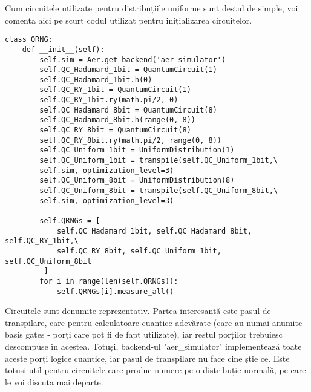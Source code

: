 Cum circuitele utilizate pentru distribuțiile uniforme sunt destul de simple, voi comenta aici pe scurt codul utilizat pentru inițializarea circuitelor.
\pagebreak
\begin{code}
\begin{verbatim}
class QRNG:
    def __init__(self):
        self.sim = Aer.get_backend('aer_simulator')
        self.QC_Hadamard_1bit = QuantumCircuit(1)
        self.QC_Hadamard_1bit.h(0)
        self.QC_RY_1bit = QuantumCircuit(1)
        self.QC_RY_1bit.ry(math.pi/2, 0)
        self.QC_Hadamard_8bit = QuantumCircuit(8)
        self.QC_Hadamard_8bit.h(range(0, 8))
        self.QC_RY_8bit = QuantumCircuit(8)
        self.QC_RY_8bit.ry(math.pi/2, range(0, 8))
        self.QC_Uniform_1bit = UniformDistribution(1)
        self.QC_Uniform_1bit = transpile(self.QC_Uniform_1bit,\
        self.sim, optimization_level=3)
        self.QC_Uniform_8bit = UniformDistribution(8)
        self.QC_Uniform_8bit = transpile(self.QC_Uniform_8bit,\
        self.sim, optimization_level=3)
        
        self.QRNGs = [
            self.QC_Hadamard_1bit, self.QC_Hadamard_8bit, self.QC_RY_1bit,\
            self.QC_RY_8bit, self.QC_Uniform_1bit, self.QC_Uniform_8bit
         ]
        for i in range(len(self.QRNGs)):
            self.QRNGs[i].measure_all()
\end{verbatim}
\end{code}

Circuitele sunt denumite reprezentativ. Partea interesantă este pasul de transpilare, care pentru calculatoare cuantice adevărate (care au numai anumite basis gates - porți care pot fi de fapt utilizate), iar restul porților trebuiesc descompuse în acestea. Totuși, backend-ul "aer\_simulator" implementează toate aceste porți logice cuantice, iar pasul de transpilare nu face cine știe ce. Este totuși util pentru circuitele care produc numere pe o distribuție normală, pe care le voi discuta mai departe.